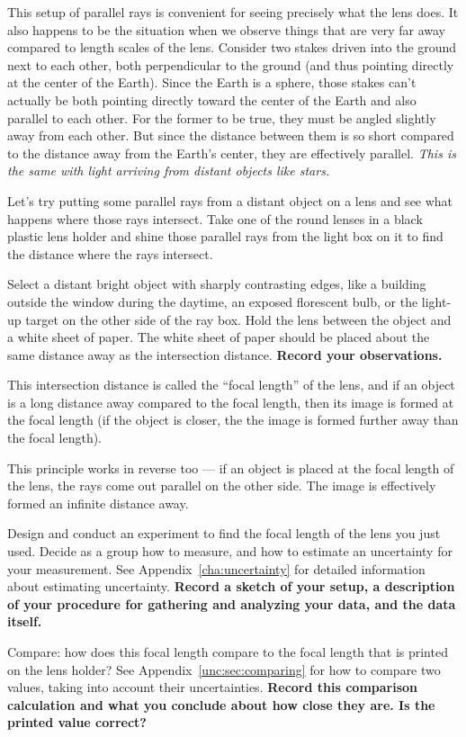 This setup of parallel rays is convenient for seeing precisely what the lens does. It also happens to be the situation when we observe things that are very far away compared to length scales of the lens. Consider two stakes driven into the ground next to each other, both perpendicular to the ground (and thus pointing directly at the center of the Earth). Since the Earth is a sphere, those stakes can't actually be both pointing directly toward the center of the Earth and also parallel to each other. For the former to be true, they must be angled slightly away from each other. But since the distance between them is so short compared to the distance away from the Earth's center, they are effectively parallel. \textit{This is the same with light arriving from distant objects like stars.}

\begin{steps}
	\item Let's try putting some parallel rays from a distant object on a lens and see what happens where those rays intersect. Take one of the round lenses in a black plastic lens holder and shine those parallel rays from the light box on it to find the distance where the rays intersect.
	
	\item Select a distant bright object with sharply contrasting edges, like a building outside the window during the daytime, an exposed florescent bulb, or the light-up target on the other side of the ray box. Hold the lens between the object and a white sheet of paper. The white sheet of paper should be placed about the same distance away as the intersection distance. \textbf{Record your observations.}
\end{steps}

This intersection distance is called the ``focal length'' of the lens, and if an object is a long distance away compared to the focal length, then its image is formed at the focal length (if the object is closer, the the image is formed further away than the focal length).

This principle works in reverse too --- if an object is placed at the focal length of the lens, the rays come out parallel on the other side. The image is effectively formed an infinite distance away.

\begin{steps}
	\item Design and conduct an experiment to find the focal length of the lens you just used. Decide as a group how to measure, and how to estimate an uncertainty for your measurement. See Appendix\ \ref{cha:uncertainty} for detailed information about estimating uncertainty. \textbf{Record a sketch of your setup, a description of your procedure for gathering and analyzing your data, and the data itself.}
	
	\item Compare: how does this focal length compare to the focal length that is printed on the lens holder? See Appendix\ \ref{unc:sec:comparing} for how to compare two values, taking into account their uncertainties. \textbf{Record this comparison calculation and what you conclude about how close they are. Is the printed value correct?}
\end{steps}

